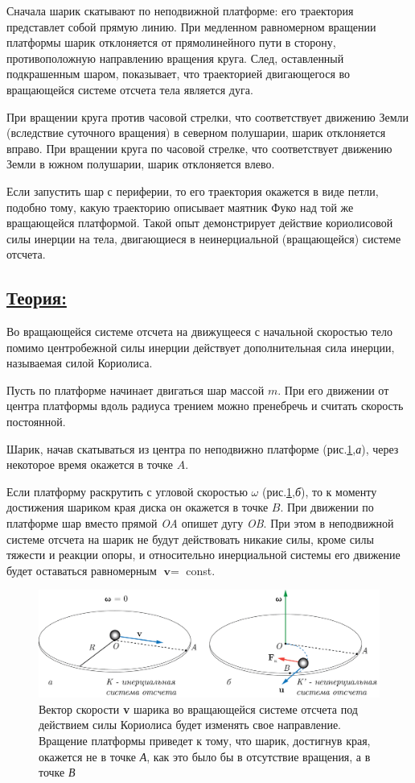 \documentclass[14pt,a4paper,oneside]{extarticle}	%
\begin{document}
Сначала шарик скатывают по неподвижной платформе: его траектория представлет собой прямую линию.
При медленном равномерном вращении платформы шарик отклоняется от прямолинейного пути в сторону, противоположную направлению вращения круга.
След, оставленный подкрашенным шаром, показывает, что траекторией двигающегося во вращающейся системе отсчета тела является дуга.

При вращении круга против часовой стрелки, что соответствует движению Земли 
(вследствие суточного вращения) в северном полушарии, шарик отклоняется вправо.
При вращении круга по часовой стрелке, что соответствует движению Земли в южном полушарии, шарик отклоняется влево.

Если запустить шар с периферии, то его траектория окажется в виде петли, подобно тому, какую траекторию описывает маятник Фуко над той же вращающейся платформой.
Такой опыт демонстрирует действие кориолисовой силы инерции на тела, двигающиеся в неинерциальной (вращающейся) системе отсчета.

\newpage
	\subsection*{\underline{Теория:}}
	
	Во вращающейся системе отсчета на движущееся с начальной скоростью тело помимо центробежной силы инерции действует дополнительная сила инерции, называемая силой Кориолиса.

	Пусть по платформе начинает двигаться шар массой $ m $.
При его движении от центра платформы вдоль радиуса трением можно пренебречь и считать скорость постоянной.
	
Шарик, начав скатываться из центра по неподвижно платформе (рис.\ref{Coriolis-3},\textit{а}), через некоторое время окажется в точке $ A $.
		
	Если платформу раскрутить с угловой скоростью $ \omega $ (рис.\ref{Coriolis-3},\textit{б}), то к моменту достижения шариком края диска он окажется в точке $ B $.
	При движении по платформе шар вместо прямой \textit{OA} опишет дугу \textit{OB}.
	При этом в неподвижной системе отсчета на шарик не будут действовать никакие силы, кроме силы тяжести и реакции опоры, и относительно инерциальной системы его движение будет оставаться равномерным  $ \textbf{v} = $ const.
	
			\begin{figure}[H] 	
		\centering 	
		\includegraphics[width=0.9\linewidth]{Coriolis-3.png}
		\caption{Вектор скорости \textbf{v} шарика во вращающейся системе отсчета под действием силы Кориолиса будет изменять свое направление. Вращение платформы приведет к тому, что шарик, достигнув края, окажется не в точке \textit{А}, как это было бы в отсутствие вращения, а в точке \textit{В}}
		\label{Coriolis-3}
	\end{figure}
\end{document}
